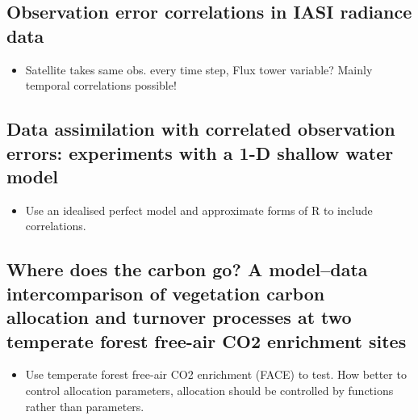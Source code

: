 \documentclass[11pt]{article}
\begin{document}
\subsection*{Observation error correlations in IASI radiance data \cite{stewart2009observation}}
\begin{itemize}
\item Satellite takes same obs. every time step, Flux tower variable? Mainly temporal correlations possible!
\end{itemize}


\subsection*{Data assimilation with correlated observation errors: experiments with a 1-D shallow water model \cite{stewart2013data}}
\begin{itemize}
\item Use an idealised perfect model and approximate forms of R to include correlations.
\end{itemize}


\subsection*{Where does the carbon go? A model--data intercomparison of vegetation carbon allocation and turnover processes at two temperate forest free-air CO2 enrichment sites \cite{de2014does}}
\begin{itemize}
\item Use temperate forest free-air CO2 enrichment (FACE) to test. How better to control allocation parameters, allocation should be controlled by functions rather than parameters.
\end{itemize}


{}

\end{document}
